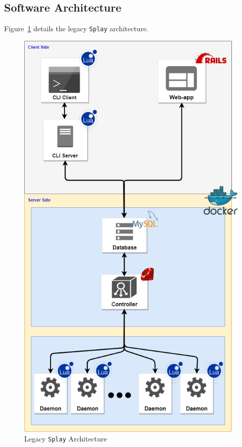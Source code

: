 \documentclass{eplmastersthesis}
\begin{document}
      \subsection{Software Architecture}

        Figure~\ref{prev_arch} details the legacy \texttt{Splay}
        architecture.

        \begin{figure}[H]
          \centering
          \includegraphics[scale=0.4]{figures/prev_arch.png}
          \caption{\label{prev_arch} Legacy \texttt{Splay} Architecture}
        \end{figure}
\end{document}
